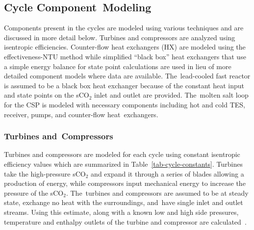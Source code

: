 \documentclass[sustainability,article,accept,moreauthors,pdftex]{Definitions/mdpi}
\begin{document}



\subsection{Cycle Component~Modeling}
Components present in the cycles are modeled using various techniques and are discussed in more detail below. Turbines and compressors are analyzed using isentropic efficiencies. Counter-flow heat exchangers (HX) are modeled using the effectiveness-NTU method while simplified ``black box'' heat exchangers that use a simple energy balance for state point calculations are used in lieu of more detailed component models where data are available. The~lead-cooled fast reactor is assumed to be a black box heat exchanger because of the constant heat input and state points on the sCO$_2$ inlet and outlet are provided. The~molten salt loop for the CSP is modeled with necessary components including hot and cold TES, receiver, pumps, and counter-flow heat~exchangers.



\subsubsection{Turbines and~Compressors }

Turbines and compressors are modeled for each cycle using constant isentropic efficiency values which are summarized in Table~\ref{tab-cycle-constants}. Turbines take the high-pressure sCO$_2$ and expand it through a series of blades allowing a production of energy, while compressors input mechanical energy to increase the pressure of the sCO$_2$. The~turbines and compressors are assumed to be at steady state, exchange no heat with the surroundings, and~have single inlet and outlet streams. Using this estimate, along with a known low and high side pressures, temperature and enthalpy outlets of the turbine and compressor are calculated~\cite{klein_nellis_2011}. 
\end{document}
